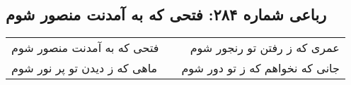 \begin{center}
\section*{رباعی شماره ۲۸۴: فتحی که به آمدنت منصور شوم}
\label{sec:sh284}
\begin{longtable}{l p{0.5cm} r}
فتحی که به آمدنت منصور شوم
&&
عمری که ز رفتن تو رنجور شوم
\\
ماهی که ز دیدن تو پر نور شوم
&&
جانی که نخواهم که ز تو دور شوم
\\
\end{longtable}
\end{center}
